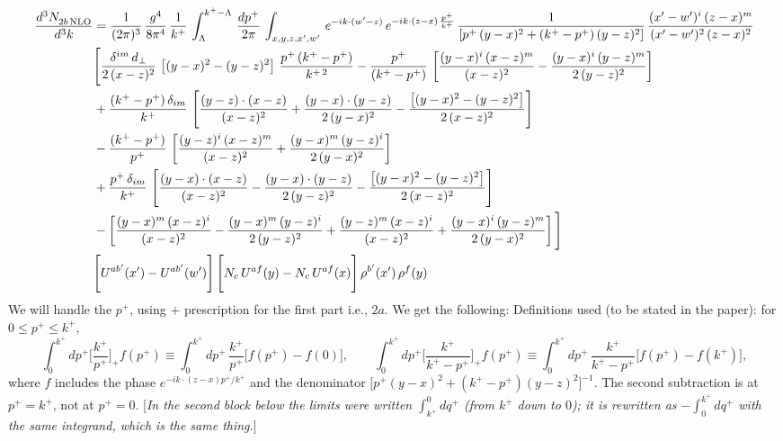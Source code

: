 \documentclass[9pt]{article}
\newcommand{\chg}[1]{{\color{red}#1}}
\newcommand{\rnote}[1]{{\color{teal}[\textit{#1}]}}
\numberwithin{equation}{section}
\begin{document}
\begin{align}
 \frac{d^{3}N_{2b\,\rm NLO}^{\rm}}{d^{3}k}  & =   \frac{1}{(2\pi)^{3}}\,\frac{g^{4}}{8\pi^{4}}\,\frac{1}{k^{+}}\,\int_{\Lambda}^{k^{+}-\Lambda}\, \frac{dp^{+}}{2\pi} \, \int_{x,y,z,x',w'}\,e^{-ik\cdot(w'-z)}\,e^{-ik\cdot (z-x)\,\frac{p^{+}}{k^{+}}}\,\frac{1}{\left[p^{+}\,(y-x)^{2}+(k^{+}-p^{+})\,(y-z)^{2}\right]}\, \frac{(x'-w')^{i}\,(z-x)^{m}}{(x'-w')^{2}\,(z-x)^{2}} \notag \\ & \Bigg[\frac{\delta^{im}\,d_{\perp}}{2\,(x-z)^{2}}\,\left[(y-x)^{2}-(y-z)^{2}\right]\,\frac{p^{+}\,(k^{+}-p^{+})}{k^{+\,2}}-\frac{p^{+}}{(k^{+}-p^{+})}\,\left[\frac{(y-x)^{i}\,(x-z)^{m}}{(x-z)^{2}}-\frac{(y-x)^{i}\,(y-z)^{m}}{2\,(y-z)^{2}}\right]\notag \\ & +\frac{(k^{+}-p^{+})\,\delta_{im}}{k^{+}}\,\left[\frac{(y-z)\cdot (x-z)}{(x-z)^{2}}+\frac{(y-x)\cdot (y-z)}{2\,(y-x)^{2}}-\frac{\left[(y-x)^{2}-(y-z)^{2}\right]}{2\,(x-z)^{2}}\right]\notag \\ & -\frac{(k^{+}-p^{+})}{p^{+}}\,\left[\frac{(y-z)^{i}\,(x-z)^{m}}{(x-z)^{2}}+\frac{(y-x)^{m}\,(y-z)^{i}}{2\,(y-x)^{2}}\right]\notag \\ & +\frac{p^{+}\,\delta_{im}}{k^{+}}\,\left[\frac{(y-x)\cdot (x-z)}{(x-z)^{2}}-\frac{(y-x)\cdot (y-z)}{2\,(y-z)^{2}}-\frac{\left[(y-x)^{2}-(y-z)^{2}\right]}{2\,(x-z)^{2}}\right]\notag \\ &-\left[\frac{(y-x)^{m}\,(x-z)^{i}}{(x-z)^{2}}-\frac{(y-x)^{m}\,(y-z)^{i}}{2\,(y-z)^{2}}+\frac{(y-z)^{m}\,(x-z)^{i}}{(x-z)^{2}}+\frac{(y-x)^{i}\,(y-z)^{m}}{2\,(y-x)^{2}}\right]\Bigg] \notag \\ & \Bigg[U^{ab'}(x')-U^{ab'}(w')\Bigg]\,\Bigg[N_{c}\,U^{af}(y) -N_{c}\,U^{af}(x)\Bigg]\,\rho^{b'}(x')\,\rho^{f}(y)
\end{align}
We will handle the $p^{+}$, using $+$ prescription for the first part i.e., $2a$. We get the following: 
\chg{Definitions used (to be stated in the paper): for $0\le p^{+}\le k^{+}$,
$$\int_{0}^{k^{+}}dp^{+}\Big[\frac{k^{+}}{p^{+}}\Big]_{+}f(p^{+})\equiv\int_{0}^{k^{+}}dp^{+}\,\frac{k^{+}}{p^{+}}\big[f(p^{+})-f(0)\big],\qquad
\int_{0}^{k^{+}}dp^{+}\Big[\frac{k^{+}}{k^{+}-p^{+}}\Big]_{+}f(p^{+})\equiv\int_{0}^{k^{+}}dp^{+}\,\frac{k^{+}}{k^{+}-p^{+}}\big[f(p^{+})-f(k^{+})\big],$$
where $f$ includes the phase $e^{-ik\cdot(z-x)p^{+}/k^{+}}$ and the denominator $\big[p^{+}(y-x)^{2}+(k^{+}-p^{+})(y-z)^{2}\big]^{-1}$. The second subtraction is at $p^{+}=k^{+}$, not at $p^{+}=0$.}
\rnote{In the second block below the limits were written $\int^{0}_{k^{+}}dq^{+}$ (from $k^{+}$ down to $0$); it is rewritten as $-\int_{0}^{k^{+}}dq^{+}$ with the same integrand, which is the same thing.}
\end{document}
